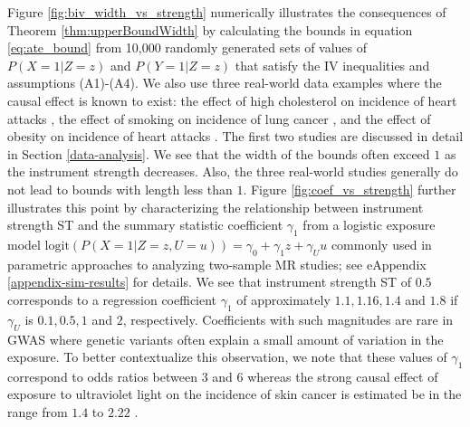 \documentclass[
]{article}
\theoremstyle{plain}
\begin{document}
Figure \ref{fig:biv_width_vs_strength} numerically illustrates the consequences of Theorem \ref{thm:upperBoundWidth} by calculating the bounds in equation \eqref{eq:ate_bound} from 10,000 randomly generated sets of values of \(P(X = 1 | Z = z)\) and \(P(Y = 1 | Z = z)\) that satisfy the IV inequalities and assumptions (A1)-(A4). We also use three real-world data examples where the causal effect is known to exist: the effect of high cholesterol on incidence of heart attacks \autocite{cholesterol_treatment_trialists_ctt_collaborators_effects_2012}, the effect of smoking on incidence of lung cancer \autocite{cornfield_smoking_1959}, and the effect of obesity on incidence of heart attacks \autocite{yusuf_obesity_2005}. The first two studies are discussed in detail in Section \ref{data-analysis}. We see that the width of the bounds often exceed \(1\) as the instrument strength decreases. Also, the three real-world studies generally do not lead to bounds with length less than \(1\). Figure \ref{fig:coef_vs_strength} further illustrates this point by characterizing the relationship between instrument strength ST and the summary statistic coefficient \(\gamma_1\) from a logistic exposure model \(\text{logit}(P(X = 1 | Z = z, U = u)) = \gamma_0 + \gamma_1 z + \gamma_U u\) commonly used in parametric approaches to analyzing two-sample MR studies; see eAppendix \ref{appendix-sim-results} for details. We see that instrument strength ST of \(0.5\) corresponds to a regression coefficient \(\gamma_1\) of approximately \(1.1, 1.16, 1.4\) and \(1.8\) if \(\gamma_U\) is \(0.1, 0.5, 1\) and \(2\), respectively. Coefficients with such magnitudes are rare in GWAS where genetic variants often explain a small amount of variation in the exposure. To better contextualize this observation, we note that these values of \(\gamma_1\) correspond to odds ratios between \(3\) and \(6\) whereas the strong causal effect of exposure to ultraviolet light on the incidence of skin cancer is estimated be in the range from \(1.4\) to \(2.22\) \autocite{schmitt_occupational_2011}.
\end{document}
